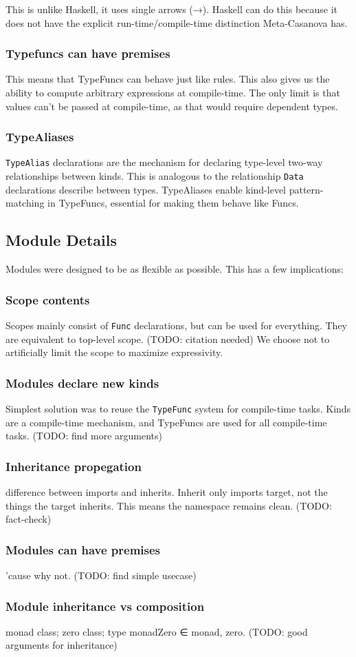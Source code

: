 This is unlike Haskell, it uses single arrows (→).
Haskell can do this because it does not have the explicit run-time/compile-time distinction Meta-Casanova has.

\subsubsection*{Typefuncs can have premises}
This means that TypeFuncs can behave just like rules.
This also gives us the ability to compute arbitrary expressions at compile-time.
The only limit is that values can't be passed at compile-time, as that would require dependent types.

\subsubsection*{TypeAliases}
\texttt{TypeAlias} declarations are the mechanism for declaring type-level two-way relationships between kinds.
This is analogous to the relationship \texttt{Data} declarations describe between types.
TypeAliases enable kind-level pattern-matching in TypeFuncs, essential for making them behave like Funcs.


\subsection{Module Details}
Modules were designed to be as flexible as possible.
This has a few implications:

\subsubsection*{Scope contents}
Scopes mainly consist of \texttt{Func} declarations, but can be used for everything.
They are equivalent to top-level scope. (TODO: citation needed) 
We choose not to artificially limit the scope to maximize expressivity.

\subsubsection*{Modules declare new kinds}
Simplest solution was to reuse the \texttt{TypeFunc} system for compile-time tasks.
Kinds are a compile-time mechanism, and TypeFuncs are used for all compile-time tasks.
(TODO: find more arguments)

\subsubsection*{Inheritance propegation}
difference between imports and inherits.
Inherit only imports target, not the things the target inherits.
This means the namespace remains clean. (TODO: fact-check)

\subsubsection*{Modules can have premises}
'cause why not. (TODO: find simple usecase)

\subsubsection*{Module inheritance vs composition}
monad class; zero class; type monadZero ∈ monad, zero.
(TODO: good arguments for inheritance)


